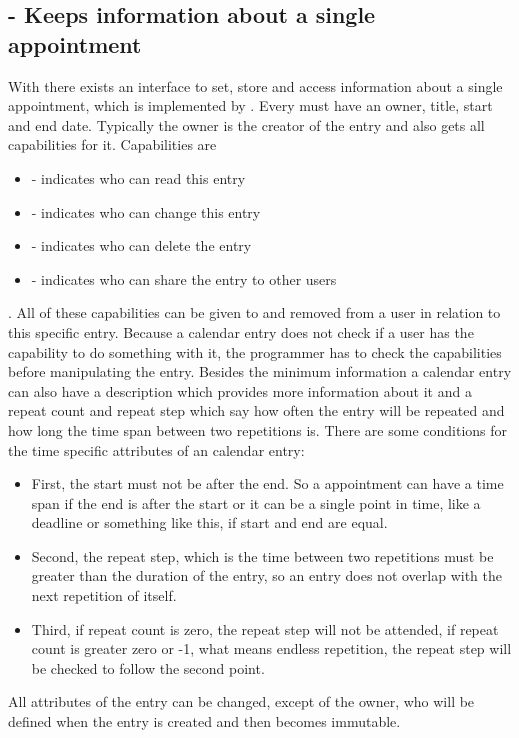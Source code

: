 \subsection{ - Keeps information about a single appointment}

With  there exists an interface to set, store and access information about a single appointment, which is implemented
by .
Every  must have an owner, title, start and end date.
Typically the owner is the creator of the entry and also gets all capabilities for it.
Capabilities are
\begin{itemize}
    \item {} - indicates who can read this entry
    \item {} - indicates who can change this entry
    \item {} - indicates who can delete the entry
    \item {} - indicates who can share the entry to other users
\end{itemize}.
All of these capabilities can be given to and removed from a user in relation to this specific entry.
Because a calendar entry does not check if a user has the capability to do something with it, the programmer has to check the capabilities before manipulating the entry.
Besides the minimum information a calendar entry can also have a description which provides more information about it and a repeat count and repeat step which say how 
often the entry will be repeated and how long the time span between two repetitions is.
There are some conditions for the time specific attributes of an calendar entry:
\begin{itemize}
    \item First, the start must not be after the end. So a appointment can have a time span if the end is after the start or it can be a single point in time, like a deadline or something like this, if start and end are equal.
    \item Second, the repeat step, which is the time between two repetitions must be greater than the duration of the entry, so an entry does not overlap with the next repetition of itself.
    \item Third, if repeat count is zero, the repeat step will not be attended, if repeat count is greater zero or -1, what means endless repetition, the repeat step will be checked to follow the second point.
\end{itemize}
All attributes of the entry can be changed, except of the owner, who will be defined when the entry is created and then becomes immutable. 
